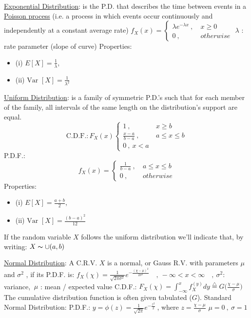 \documentclass[12pt]{article}
\def\Var{\text{Var\ }} %
\begin{document}
\begin{flushleft}
	\uline{Exponential Distribution}: is the P.D. that describes the time between events in a \uline{Poisson process} (i.e. a process in which events occur continuously and independently at a constant average rate) \linebreak 
	$f_X(x) = \begin{cases} \lambda e^{-\lambda x} \ , &\ x\geq 0 \\ 0 \ , &\ otherwise \end{cases} $ \linebreak 
	$\lambda$  :  rate parameter (slope of curve) \linebreak 
	Properties:
	\begin{itemize}
	\item (i) \quad $E[X] = \frac{1}{\lambda} $, 
	\item (ii) \quad $\Var[X] = \frac{1}{\lambda^2} $
	\end{itemize}
	
	\uline{Uniform Distribution}: is a family of symmetric P.D.'s such that for each member of the family, all intervals of the same length on the distribution's support are equal. \linebreak 
	$$ \text{C.D.F.}: F_X(x) 
	\begin{cases} 
		1 \ , & \ x \geq b \\ 
		\frac{x-a}{b-a} \ , & \ a\leq x \leq b \\ 
		0 \ , \ x<a	
	\end{cases} $$ 
	P.D.F.: \linebreak 
	$$\displaystyle f_X(x) = 
	\begin{cases} 
	\frac{1}{b-a} \ , & \ a\leq x \leq b \\ 
	0 \ , & \ otherwise	
	\end{cases}$$
	Properties: 
	\begin{itemize}
	\item (i) \quad $E[X] = \frac{a+b}{2} $, 
	\item (ii) \quad $\Var[X] = \frac{(b-a)^2}{12} $ 
	\end{itemize}
	If the random variable $X$ follows the uniform distribution we'll indicate that, by writing: $X \thicksim \cup (a,b) $ \linebreak 
	
	\uline{Normal Distribution}: A C.R.V. $X$ is a normal, or Gauss R.V. with parameters $\mu$ and $\sigma^2$ , if its P.D.F. is: \linebreak 
	$\displaystyle f_X (\chi) = \frac{1}{\sqrt{2\pi \sigma^2}} e^{-\frac{(\chi-\mu)^2}{2\sigma^2}} \quad , \ -\infty < x < \infty \quad , \ \sigma^2: $ variance, $\ \mu$  :  mean / expected value \linebreak 
	C.D.F.: $F_X(\chi) = \int_{-\infty}^x f_X^(y) dy \overset{\triangle}{=} G\big( \frac{\chi - \mu}{\sigma} \big) $\linebreak 
	The cumulative distribution function is often given tabulated ($G$). \linebreak 
	Standard Normal Distribution: P.D.F.: $\displaystyle y = \phi(z) = \frac{1}{\sqrt{2\pi}} e^{-\frac{z^2}{2}} \ $, where $z= \frac{\chi -\mu}{\sigma} $ \qquad $\mu = 0\ , \ \sigma = 1$ \linebreak 
	

\end{flushleft}
\end{document}
